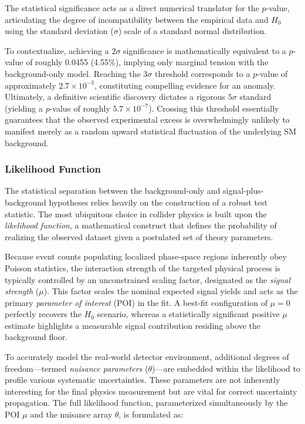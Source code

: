 The statistical significance acts as a direct numerical translator for the $p$-value, articulating the degree of incompatibility between the empirical data and $H_0$ using the standard deviation ($\sigma$) scale of a standard normal distribution.

To contextualize, achieving a $2\sigma$ significance is mathematically equivalent to a $p$-value of roughly 0.0455 (4.55\%), implying only marginal tension with the background-only model. Reaching the $3\sigma$ threshold corresponds to a $p$-value of approximately $2.7 \times 10^{-3}$, constituting compelling evidence for an anomaly. Ultimately, a definitive scientific discovery dictates a rigorous $5\sigma$ standard (yielding a $p$-value of roughly $5.7 \times 10^{-7}$). Crossing this threshold essentially guarantees that the observed experimental excess is overwhelmingly unlikely to manifest merely as a random upward statistical fluctuation of the underlying SM background.

\subsubsection{Likelihood Function}
\label{sec:likelihood}

The statistical separation between the background-only and signal-plus-background hypotheses relies heavily on the construction of a robust test statistic. The most ubiquitous choice in collider physics is built upon the \textit{likelihood function}, a mathematical construct that defines the probability of realizing the observed dataset given a postulated set of theory parameters.

Because event counts populating localized phase-space regions inherently obey Poisson statistics, the interaction strength of the targeted physical process is typically controlled by an unconstrained scaling factor, designated as the \textit{signal strength} ($\mu$). This factor scales the nominal expected signal yields and acts as the primary \textit{parameter of interest} (POI) in the fit. A best-fit configuration of $\mu = 0$ perfectly recovers the $H_0$ scenario, whereas a statistically significant positive $\mu$ estimate highlights a measurable signal contribution residing above the background floor.

To accurately model the real-world detector environment, additional degrees of freedom—termed \textit{nuisance parameters} ($\theta$)—are embedded within the likelihood to profile various systematic uncertainties. These parameters are not inherently interesting for the final physics measurement but are vital for correct uncertainty propagation. The full likelihood function, parameterized simultaneously by the POI $\mu$ and the nuisance array $\theta$, is formulated as:

